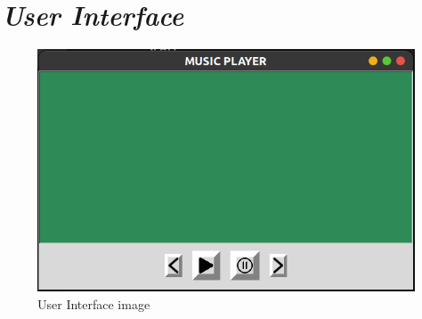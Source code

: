\documentclass{article}
\begin{document}
\section{\emph{User Interface}}

\begin{figure}[ht]
\includegraphics[width=\columnwidth]{images/figure.png}
\caption{User Interface image}
\label{fig:1}


\end{figure}
\end{document}
